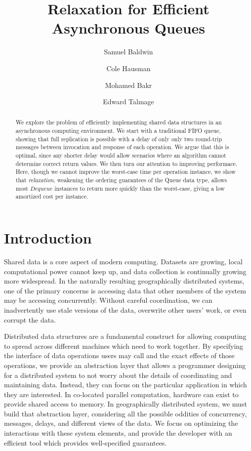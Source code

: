 \documentclass[a4paper,USenglish]{lipics-v2021} %
\title{Relaxation for Efficient Asynchronous Queues}
\author{Samuel Baldwin}{Bucknell University, USA}{}{orcid}{}
\author{Cole Hausman}{Bucknell University, USA}{}{[orcid]}{}
\author{Mohamed Bakr}{Bucknell University, USA}{}{ORCID}{}
\author{Edward Talmage}{Bucknell Univserity, USA}{elt006@bucknell.edu}{https://orcid.org/0009-0001-9108-6190}{}
\begin{document}
\maketitle

\begin{abstract}
We explore the problem of efficiently implementing shared data structures in an asynchronous computing environment.  We start with a traditional FIFO queue, showing that full replication is possible with a delay of only only two round-trip messages between invocation and response of each operation.  We argue that this is optimal, since any shorter delay would allow scenarios where an algorithm cannot determine correct return values.  We then turn our attention to improving performace.  Here, though we cannot improve the worst-case time per operation instance, we show that \emph{relaxation}, weakening the ordering guarantees of the Queue data type, allows most $Dequeue$ instances to return more quickly than the worst-case, giving a low amortized cost per instance.
\end{abstract}

\section{Introduction}

Shared data is a core aspect of modern computing.  Datasets are growing, local computational power cannot keep up, and data collection is continually growing more widespread.  In the naturally resulting geographically distributed systems, one of the primary concerns is accessing data that other members of the system may be accessing concurrently.  Without careful coordination, we can inadvertently use stale versions of the data, overwrite other users' work, or even corrupt the data.

Distributed data structures are a fundamental construct for allowing computing to spread across different machines which need to work together.  By specifying the interface of data operations users may call and the exact effects of those operations, we provide an abstraction layer that allows a programmer designing for a distributed system to not worry about the details of coordinating and maintaining data.  Instead, they can focus on the particular application in which they are interested.  In co-located parallel computation, hardware can exist to provide shared access to memory.  In geographically distributed system, we must build that abstraction layer, considering all the possible oddities of concurrency, messages, delays, and different views of the data.  We focus on optimizing the interactions with these system elements, and provide the developer with an efficient tool which provides well-specified guarantees.
\end{document}
